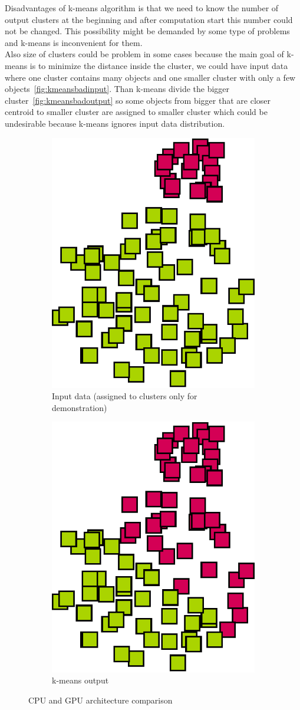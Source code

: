 Disadvantages of k-means algorithm is that we need to know the number of output clusters at the beginning and after computation start this number could not be changed. This possibility might be demanded by some type of problems and k-means is inconvenient for them.\\ 
Also size of clusters could be problem in some cases because the main goal of k-means is to minimize the distance inside the cluster, we could have input data where one cluster contains many objects and one smaller cluster with only a few objects~\autoref{fig:kmeansbadinput}. Than k-means divide the bigger cluster~\autoref{fig:kmeansbadoutput} so some objects from bigger that are closer centroid to smaller cluster are assigned to smaller cluster which could be undesirable because k-means ignores input data distribution. %

\begin{figure}[h]
\centering
\begin{subfigure}{.49\textwidth}
  \centering
  \includegraphics[width=.5\linewidth]{img/kmeans_badsample1.eps}
  \caption{Input data (assigned to clusters only for demonstration)}
  \label{fig:kmeansbadinput}
\end{subfigure}
\begin{subfigure}{.49\textwidth}
  \centering
  \includegraphics[width=.5\linewidth]{img/kmeans_badsample2.eps}
  \caption{k-means output}
  \label{fig:kmeansbadoutput}
\end{subfigure}
\caption{CPU and GPU architecture comparison}
\end{figure}

